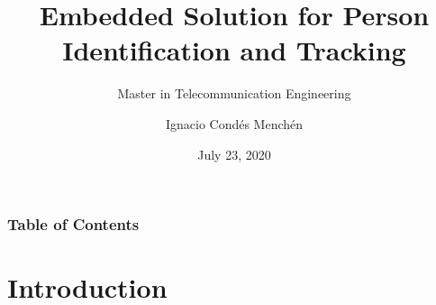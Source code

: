 \documentclass[11pt]{beamer}
\begin{document}
 
	\author{Ignacio Condés Menchén}
	\title{Embedded Solution for Person Identification and Tracking}
	\subtitle{Master in Telecommunication Engineering}
	\date{July 23, 2020}

\begin{frame}[plain]
	\maketitle
\end{frame}

\begin{frame}
	\frametitle{Table of Contents}
	\tableofcontents
\end{frame}

\section{Introduction}
\end{document}
